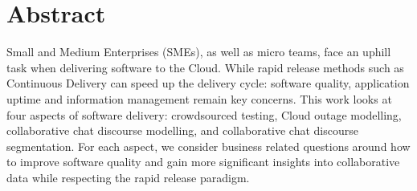 

\chapter*{Abstract}

Small and Medium Enterprises (SMEs), as well as micro teams, face an uphill task when delivering software to the Cloud. While rapid release methods such as Continuous Delivery can speed up the delivery cycle: software quality, application uptime and information management remain key concerns. This work looks at four aspects of software delivery: crowdsourced testing, Cloud outage modelling, collaborative chat discourse modelling, and collaborative chat discourse segmentation. For each aspect, we consider business related questions around how to improve software quality and gain more significant insights into collaborative data while respecting the rapid release paradigm.
\newpage



